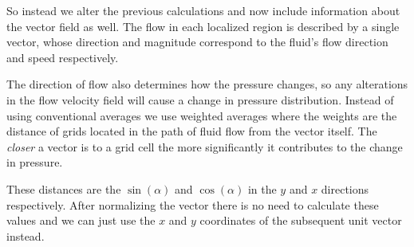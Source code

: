 \documentclass[12pt, titlepage]{article}
\begin{document}
\begin{center}
\end{center}

So instead we alter the previous calculations and now include information about the vector field as well. The flow in each localized region is described by a single vector, whose direction and magnitude correspond to the fluid's flow direction and speed respectively.

\bigskip

The direction of flow also determines how the pressure changes, so any alterations in the flow velocity field will cause a change in pressure distribution.
Instead of using conventional averages we use weighted averages where the weights are the distance of grids located in the path of fluid flow from the vector itself.
The \textit{closer} a vector is to a grid cell the more significantly it contributes to the change in pressure. 

\bigskip

These distances are the $\sin(\alpha)$ and $\cos(\alpha)$ in the $y$ and $x$ directions respectively. After normalizing the vector there is no need to calculate these values and we can just use the $x$ and $y$ coordinates of the subsequent unit vector instead.
\end{document}
